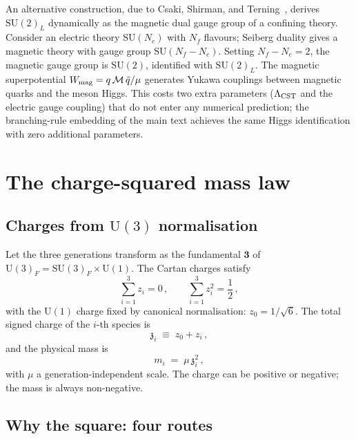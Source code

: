 \documentclass[12pt,a4paper]{article}
\newcommand{\SU}{\mathrm{SU}}
\newcommand{\UU}{\mathrm{U}}
\newcommand{\Nf}{N_{\!f}}
\newcommand{\zch}{\mathfrak{z}}
\begin{document}
An alternative construction, due to Csaki, Shirman, and
Terning~\cite{Csaki:2011xn}, derives $\SU(2)_L$ dynamically
as the magnetic dual gauge group of a confining theory.
Consider an electric theory $\SU(N_e)$ with $\Nf$ flavours;
Seiberg duality gives a magnetic theory with gauge group
$\SU(\Nf - N_e)$.
Setting $\Nf - N_e = 2$, the magnetic gauge group is
$\SU(2)$, identified with $\SU(2)_L$.
The magnetic superpotential
$W_{\rm mag} = q\,\mathcal{M}\,\tilde{q}/\mu$ generates
Yukawa couplings between magnetic quarks and the meson Higgs.
This costs two extra parameters ($\Lambda_{\rm CST}$ and the
electric gauge coupling) that do not enter any numerical
prediction; the branching-rule embedding of the main text
achieves the same Higgs identification with zero additional
parameters.


\section{The charge-squared mass law}
\label{sec:charges}

\subsection{Charges from $\UU(3)$ normalisation}

Let the three generations transform as the fundamental
$\mathbf{3}$ of $\UU(3)_F = \SU(3)_F \times \UU(1)$.
The Cartan charges satisfy
\begin{equation}
  \sum_{i=1}^3 z_i = 0\,,
  \qquad
  \sum_{i=1}^3 z_i^2 = \frac{1}{2}\,,
  \label{eq:su3}
\end{equation}
with the $\UU(1)$ charge fixed by canonical normalisation:
$z_0 = 1/\sqrt{6}$.
The total signed charge of the $i$-th species is
\begin{equation}
  \zch_i \;\equiv\; z_0 + z_i\,,
  \label{eq:charge}
\end{equation}
and the physical mass is
\begin{equation}
  \boxed{m_i \;=\; \mu\,\zch_i^2\,,}
  \label{eq:massansatz}
\end{equation}
with $\mu$ a generation-independent scale.
The charge can be positive or negative; the mass is always
non-negative.

\subsection{Why the square: four routes}
\end{document}
